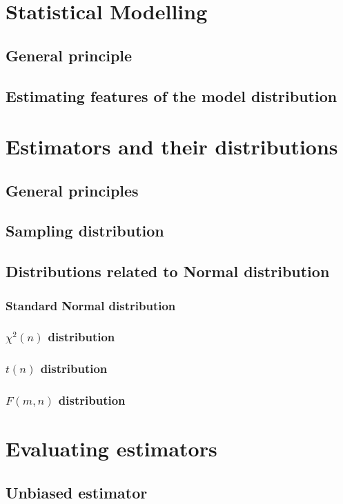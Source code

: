 \documentclass[a4paper]{article}
\begin{document}
\newpage
\section{Statistical Modelling}
\subsection{General principle}
\subsection{Estimating features of the model distribution}
\newpage
\section{Estimators and their distributions}
\subsection{General principles}
\subsection{Sampling distribution}
\subsection{Distributions related to Normal distribution}
\subsubsection*{Standard Normal distribution}
\subsubsection*{$\chi^2(n)$ distribution}
\subsubsection*{$t(n)$ distribution}
\subsubsection*{$F(m,n)$ distribution}
\newpage
\section{Evaluating estimators}
\subsection{Unbiased estimator}
\end{document}
